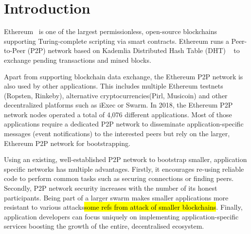 
\section{Introduction}
 Ethereum~\cite{buterin2013ethereum}  is one of the largest permissionless,  open-source  blockchains supporting Turing-complete scripting via smart contracts. Ethereum runs a Peer-to-Peer (P2P) network based on Kademlia Distributed Hash Table (DHT) ~\cite{maymounkov2002kademlia} to exchange pending transactions and mined blocks. 


Apart from supporting blockchain data exchange, the Ethereum P2P network is also used by other applications. This includes multiple Ethereum testnets (Ropsten, Rinkeby),  alternative cryptocurrencies(Pirl, Musicoin) and other decentralized platforms such as iExec or Swarm.
In 2018, the Ethereum P2P network nodes operated a total of 4,076 different applications\cite{kim2018measuring}. Most of those applications require a dedicated P2P network to disseminate application-specific messages (\eg event notifications) to the interested peers but rely on the larger, Ethereum P2P network for bootstrapping.

Using an existing, well-established P2P network to bootstrap smaller, application specific networks has multiple advantages. Firstly, it encourages re-using reliable code to perform common tasks such as securing connections or finding peers. Secondly, P2P network security increases with the number of its honest participants. Being part of a larger swarm makes smaller applications more resistant to various attacks\hl{some refs from attack of smaller blockchains}. Finally, application developers can focus uniquely on implementing application-specific services boosting the growth of the entire, decentralised ecosystem. 

